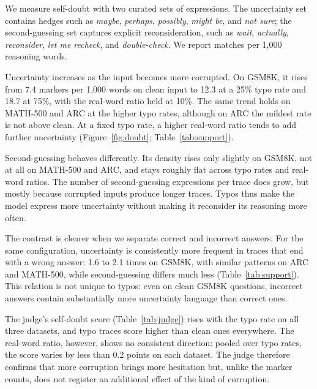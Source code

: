 \documentclass[11pt]{article}
\begin{document}
\begin{table}[tbp]
\centering
\footnotesize

\caption{Mean LLM-judge scores over answered traces. \emph{repair} is the repair
score (0--5, higher means less of the intended meaning recovered); \emph{doubt}
is the self-doubt score (0--10, higher means more hesitation and looping).}
\label{tab:judge}
\end{table}

We measure self-doubt with two curated sets of expressions. The uncertainty set
contains hedges such as \emph{maybe}, \emph{perhaps}, \emph{possibly},
\emph{might be}, and \emph{not sure}; the second-guessing set captures explicit
reconsideration, such as \emph{wait}, \emph{actually}, \emph{reconsider},
\emph{let me recheck}, and \emph{double-check}. We report matches per 1,000
reasoning words.

Uncertainty increases as the input becomes more corrupted. On GSM8K, it rises
from 7.4 markers per 1,000 words on clean input to 12.3 at a 25\% typo rate and
18.7 at 75\%, with the real-word ratio held at 10\%. The same trend holds on
MATH-500 and ARC at the higher typo rates, although on ARC the mildest rate is
not above clean. At a fixed typo rate, a higher real-word ratio tends to add
further uncertainty (Figure~\ref{fig:doubt}; Table~\ref{tab:support}).

Second-guessing behaves differently. Its density rises only slightly on GSM8K,
not at all on MATH-500 and ARC, and stays roughly flat across typo rates and
real-word ratios. The number of second-guessing expressions per trace does grow,
but mostly because corrupted inputs produce longer traces. Typos thus make the
model express more uncertainty without making it reconsider its reasoning more
often.

The contrast is clearer when we separate correct and incorrect answers. For the
same configuration, uncertainty is consistently more frequent in traces that end
with a wrong answer: 1.6 to 2.1 times on GSM8K, with similar patterns on ARC and
MATH-500, while second-guessing differs much less (Table~\ref{tab:support}).
This relation is not unique to typos: even on clean GSM8K questions, incorrect
answers contain substantially more uncertainty language than correct ones.

The judge's self-doubt score (Table~\ref{tab:judge}) rises with the typo rate on
all three datasets, and typo traces score higher than clean ones everywhere. The
real-word ratio, however, shows no consistent direction: pooled over typo rates,
the score varies by less than 0.2 points on each dataset. The judge therefore
confirms that more corruption brings more hesitation but, unlike the marker
counts, does not register an additional effect of the kind of corruption.
\end{document}
